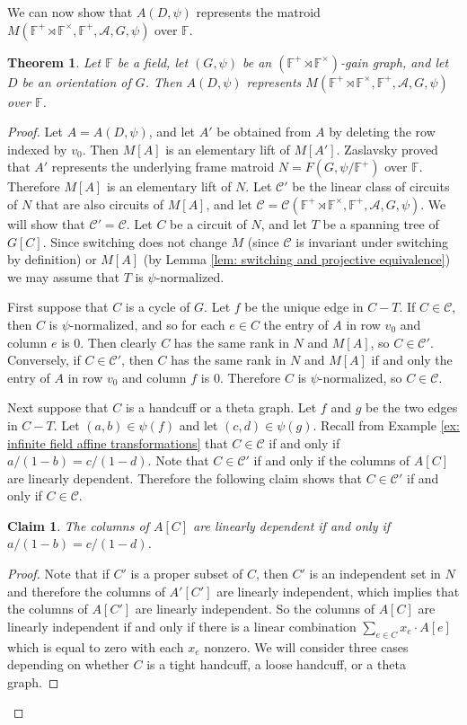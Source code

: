\documentclass[12pt]{article}
\newtheorem{theorem}{Theorem}[section]
\newtheorem{claim}{Claim}[theorem]
\theoremstyle{definition}
\newcommand{\bF}{\mathbb F}
\newcommand{\cA}{\mathcal{A}}
\newcommand{\cC}{\mathcal{C}}
\begin{document}
We can now show that $A(D, \psi)$ represents the matroid $M(\bF^{+} \rtimes \bF^{\times}, \bF^+, \cA, G, \psi)$ over $\bF$.



\begin{theorem} \label{thm: matrix representation}
Let $\bF$ be a field, let $(G, \psi)$ be an $(\bF^{+} \rtimes \bF^{\times})$-gain graph, and let $D$ be an orientation of $G$.
Then $A(D, \psi)$ represents $M(\bF^{+} \rtimes \bF^{\times}, \bF^+, \cA, G, \psi)$ over $\bF$.
\end{theorem}
\begin{proof}
Let $A = A(D, \psi)$, and let $A'$ be obtained from $A$ by deleting the row indexed by $v_0$.
Then $M[A]$ is an elementary lift of $M[A']$.
Zaslavsky \cite[Theorem 2.1]{Zaslavsky2003} proved that $A'$ represents the underlying frame matroid $N = F(G, \psi/\bF^+)$ over $\bF$.
Therefore $M[A]$ is an elementary lift of $N$.
Let $\cC'$ be the linear class of circuits of $N$ that are also circuits of $M[A]$, and let $\cC = \cC(\bF^{+} \rtimes \bF^{\times}, \bF^+, \cA, G, \psi)$.
We will show that $\cC' = \cC$.
Let $C$ be a circuit of $N$, and let $T$ be a spanning tree of $G[C]$.
Since switching does not change $M$ (since $\cC$ is invariant under switching by definition) or $M[A]$ (by Lemma \ref{lem: switching and projective equivalence}) we may assume that $T$ is $\psi$-normalized.

First suppose that $C$ is a cycle of $G$.
Let $f$ be the unique edge in $C - T$.
If $C \in \cC$, then $C$ is $\psi$-normalized, and so for each $e \in C$ the entry of $A$ in row $v_0$ and column $e$ is $0$.
Then clearly $C$ has the same rank in $N$ and $M[A]$, so $C \in \cC'$.
Conversely, if $C \in \cC'$, then $C$ has the same rank in $N$ and $M[A]$ if and only the entry of $A$ in row $v_0$ and column $f$ is $0$.
Therefore $C$ is $\psi$-normalized, so $C \in \cC$.

Next suppose that $C$ is a handcuff or a theta graph.
Let $f$ and $g$ be the two edges in $C - T$.
Let $(a,b) \in \psi(f)$ and let $(c,d) \in \psi(g)$.
Recall from Example \ref{ex: infinite field affine transformations} that  $C \in \cC$ if and only if $a/(1 - b) = c/(1 - d)$.
Note that $C \in \cC'$ if and only if the columns of $A[C]$ are linearly dependent.
Therefore the following claim shows that $C \in \cC'$ if and only if $C \in \cC$.

\begin{claim}
The columns of $A[C]$ are linearly dependent if and only if $a/(1-b) = c/(1-d)$.
\end{claim}
\begin{proof}
Note that if $C'$ is a proper subset of $C$, then $C'$ is an independent set in $N$ and therefore the columns of $A'[C']$ are linearly independent, which implies that the columns of $A[C']$ are linearly independent.
So the columns of $A[C]$ are linearly independent if and only if there is a linear combination $\sum_{e \in C} x_e  \cdot A[e]$ which is equal to zero with each $x_e$ nonzero.
We will consider three cases depending on whether $C$ is a tight handcuff, a loose handcuff, or a theta graph.




\end{proof}
\end{proof}
\end{document}
